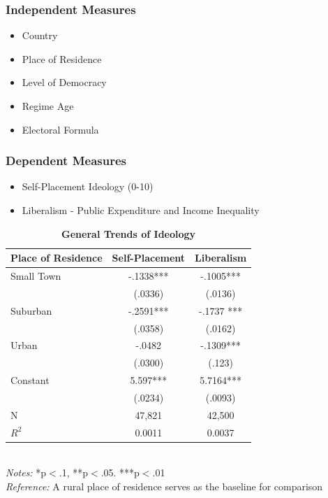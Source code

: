\documentclass[20pt]{beamer}
\newcommand\e{\emph}
\newcommand\tb{\textbf}
\begin{document}
\begin{frame}
\frametitle{Independent Measures}
\begin{itemize}
	\item Country
	\item Place of Residence
	\item Level of Democracy
	\item Regime Age
	\item Electoral Formula
\end{itemize}
\end{frame}

\begin{frame}

\frametitle{Dependent Measures}
\begin{itemize}
	\item Self-Placement Ideology (0-10)
	\item Liberalism - Public Expenditure and Income Inequality
\end{itemize}
\end{frame}

\begin{frame}
\tiny
\begin{table}[H]
	\centering
	\def\arraystretch{1}
	\caption{\tb{General Trends of Ideology}}
	\begin{tabulary}{\linewidth}{l c c}
		\hline
		\tb{Place of Residence}&\tb{Self-Placement} & \tb{Liberalism} \\
		\hline
		Small Town&-.1338***& -.1005*** \\    
		& (.0336) & (.0136)  \\
		Suburban & -.2591*** &-.1737 ***\\ 
		& (.0358) &(.0162) \\
		Urban   & -.0482 &-.1309***  \\
		& (.0300)  &(.123)  \\
		Constant   & 5.597*** &5.7164*** \\
		&(.0234) & (.0093)\\
		N  & 47,821 & 42,500 \\
		$R^2$	& 0.0011 & 0.0037 \\
		\hline                                       
	\end{tabulary}
	\\
	\e{Notes:} *p$<$.1, **p$<$.05. ***p$<$.01 \\
	\e{Reference:} A rural place of residence serves as the baseline for comparison
\end{table}
\end{frame}
\end{document}
